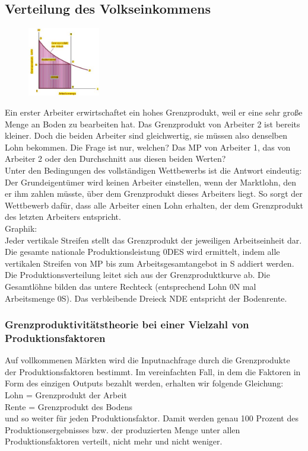 \documentclass[10pt]{scrartcl}
\begin{document}
\subsection{Verteilung des Volkseinkommens}
\begin{figure}
  \begin{center}
  	\vspace{-10pt}
    \includegraphics[width=0.28\textwidth]{img/bodenrente.jpg}
    \vspace{-10pt}
    \end{center}
\end{figure}
Ein
erster Arbeiter erwirtschaftet ein hohes Grenzprodukt, weil er eine sehr große Menge an Boden zu bearbeiten hat. Das Grenzprodukt von Arbeiter 2 ist bereits kleiner. Doch die beiden Arbeiter sind gleichwertig, sie müssen also denselben Lohn bekommen. Die Frage ist nur, welchen? Das MP von Arbeiter 1, das von Arbeiter 2 oder den Durchschnitt aus diesen beiden Werten?\\ 
Unter den Bedingungen des vollständigen Wettbewerbs ist die Antwort eindeutig: Der Grundeigentümer wird keinen Arbeiter einstellen, wenn der Marktlohn, den er ihm zahlen müsste, über dem Grenzprodukt dieses Arbeiters liegt. So sorgt der Wettbewerb dafür, dass alle Arbeiter einen Lohn erhalten, der dem Grenzprodukt des letzten Arbeiters entspricht.\\
Graphik:\\
Jeder vertikale Streifen stellt das Grenzprodukt der jeweiligen Arbeitseinheit dar. Die gesamte nationale Produktionsleistung 0DES wird ermittelt, indem alle vertikalen Streifen von MP bis zum Arbeitsgesamtangebot in S addiert werden. Die Produktionsverteilung leitet sich aus der Grenzproduktkurve ab. Die Gesamtlöhne bilden das untere Rechteck (entsprechend Lohn 0N mal Arbeitsmenge 0S). Das verbleibende Dreieck NDE entspricht der Bodenrente.
\subsubsection{Grenzproduktivitätstheorie bei einer Vielzahl von Produktionsfaktoren}
Auf vollkommenen Märkten wird die Inputnachfrage durch die Grenzprodukte der Produktionsfaktoren bestimmt. Im vereinfachten Fall, in dem die Faktoren in Form des einzigen Outputs bezahlt werden, erhalten wir folgende Gleichung:
\\
Lohn = Grenzprodukt der Arbeit\\
Rente = Grenzprodukt des Bodens\\
und so weiter für jeden Produktionsfaktor.
Damit werden genau 100 Prozent des Produktionsergebnisses bzw. der produzierten
Menge unter allen Produktionsfaktoren verteilt, nicht mehr und nicht weniger.
\end{document}
